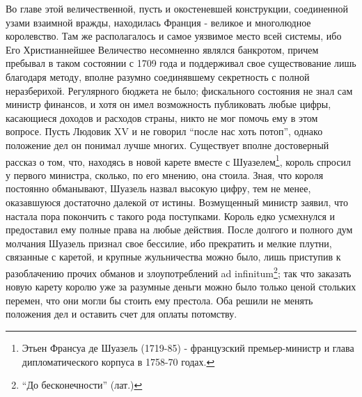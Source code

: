 \documentclass[
  oneside,
  12pt,
  titlepage]{book}
\begin{document}
Во главе этой величественной, пусть и окостеневшей конструкции, соединенной узами взаимной вражды, находилась Франция - великое и многолюдное королевство. Там же располагалось и самое уязвимое место всей системы, ибо Его Христианнейшее Величество несомненно являлся банкротом, причем пребывал в таком состоянии с 1709 года и поддерживал свое существование лишь благодаря методу, вполне разумно соединявшему секретность с полной неразберихой. Регулярного бюджета не было; фискального состояния не знал сам министр финансов, и хотя он имел возможность публиковать любые цифры, касающиеся доходов и расходов страны, никто не мог помочь ему в этом вопросе. Пусть Людовик XV и не говорил ``после нас хоть потоп'', однако положение дел он понимал лучше многих. Существует вполне достоверный рассказ о том, что, находясь в новой карете вместе с Шуазелем\footnote{Этьен Франсуа де Шуазель (1719-85) - французский премьер-министр и глава дипломатического корпуса в 1758-70 годах.}, король спросил у первого министра, сколько, по его мнению, она стоила. Зная, что короля постоянно обманывают, Шуазель назвал высокую цифру, тем не менее, оказавшуюся достаточно далекой от истины. Возмущенный министр заявил, что настала пора покончить с такого рода поступками. Король едко усмехнулся и предоставил ему полные права на любые действия. После долгого и полного дум молчания Шуазель признал свое бессилие, ибо прекратить и мелкие плутни, связанные с каретой, и крупные жульничества можно было, лишь приступив к разоблачению прочих обманов и злоупотреблений ad infinitum\footnote{``До бесконечности'' (лат.)}; так что заказать новую карету королю уже за разумные деньги можно было только ценой стольких перемен, что они могли бы стоить ему престола. Оба решили не менять положения дел и оставить счет для оплаты потомству.
\end{document}
